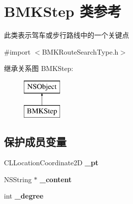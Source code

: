 \hypertarget{interface_b_m_k_step}{\section{B\-M\-K\-Step 类参考}
\label{interface_b_m_k_step}
}


此类表示驾车或步行路线中的一个关键点  




{\ttfamily \#import $<$B\-M\-K\-Route\-Search\-Type.\-h$>$}

继承关系图 B\-M\-K\-Step\-:\begin{figure}[H]
\begin{center}
\leavevmode
\includegraphics[height=2.000000cm]{interface_b_m_k_step}
\end{center}
\end{figure}
\subsection*{保护成员变量}
\begin{DoxyCompactItemize}
\item 
\hypertarget{interface_b_m_k_step_a230932a6c5fc5fe1f58720c7ecc1db5f}{C\-L\-Location\-Coordinate2\-D {\bfseries \-\_\-pt}}\label{interface_b_m_k_step_a230932a6c5fc5fe1f58720c7ecc1db5f}

\item 
\hypertarget{interface_b_m_k_step_aaec82a08f562e79fd6e71a5c4c8564f4}{N\-S\-String $\ast$ {\bfseries \-\_\-content}}\label{interface_b_m_k_step_aaec82a08f562e79fd6e71a5c4c8564f4}

\item 
\hypertarget{interface_b_m_k_step_ab33cdca63bee56baaf844b19274d80fb}{int {\bfseries \-\_\-degree}}\label{interface_b_m_k_step_ab33cdca63bee56baaf844b19274d80fb}

\end{DoxyCompactItemize}
